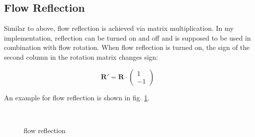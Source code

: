 \documentclass[a4paper,10pt,notitlepage]{scrartcl}
\newcommand{\mat}[1]{\mathbf{#1}}
\begin{document}
\subsection{Flow Reflection}

Similar to above, flow reflection is achieved via matrix multiplication. In my
implementation, reflection can be turned on and off and is supposed to be used
in combination with flow rotation. When flow reflection is turned on, the sign
of the second column in the rotation matrix changes sign:

\begin{equation}
 \mat{R}' = \mat{R} \cdot \left( \begin{array}{c} 1 \\ -1\end{array} \right)
\end{equation}

An example for flow reflection is shown in fig. \ref{fig:flow-reflection}.

\begin{figure}
  \centering
  \\
  \caption{flow reflection}
  \label{fig:flow-reflection}
\end{figure}
\end{document}

